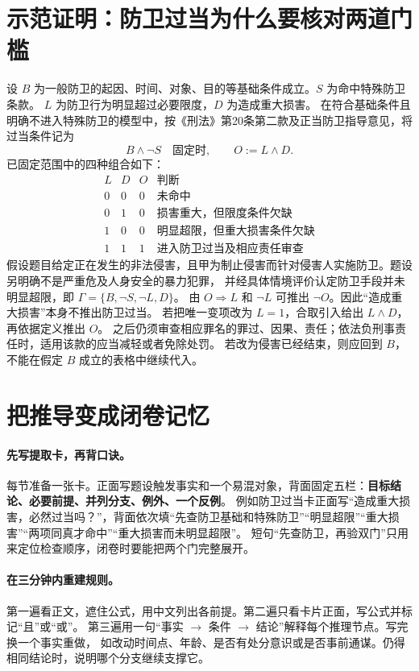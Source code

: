 \section{示范证明：防卫过当为什么要核对两道门槛}

设 $B$ 为一般防卫的起因、时间、对象、目的等基础条件成立。$S$ 为命中特殊防卫条款。
$L$ 为防卫行为明显超过必要限度，$D$ 为造成重大损害。
在符合基础条件且明确不进入特殊防卫的模型中，按《刑法》第20条第二款及正当防卫指导意见，将过当条件记为
\[
 B\land\neg S\quad\text{固定时},\qquad O:=L\land D.
\]
已固定范围中的四种组合如下：
\[
\begin{array}{cc|c|l}
 L&D&O&\text{判断}\\\hline
 0&0&0&\text{未命中}\\
 0&1&0&\text{损害重大，但限度条件欠缺}\\
 1&0&0&\text{明显超限，但重大损害条件欠缺}\\
 1&1&1&\text{进入防卫过当及相应责任审查}
\end{array}
\]
假设题目给定正在发生的非法侵害，且甲为制止侵害而针对侵害人实施防卫。题设另明确不是严重危及人身安全的暴力犯罪，
并经具体情境评价认定防卫手段并未明显超限，即 $\Gamma=\{B,\neg S,\neg L,D\}$。
由 $O\Rightarrow L$ 和 $\neg L$ 可推出 $\neg O$。因此“造成重大损害”本身不推出防卫过当。
若把唯一变项改为 $L=1$，合取引入给出 $L\land D$，再依据定义推出 $O$。
之后仍须审查相应罪名的罪过、因果、责任；依法负刑事责任时，适用该款的应当减轻或者免除处罚。
若改为侵害已经结束，则应回到 $B$，不能在假定 $B$ 成立的表格中继续代入。

\section{把推导变成闭卷记忆}

\paragraph{先写提取卡，再背口诀。}
每节准备一张卡。正面写题设触发事实和一个易混对象，背面固定五栏：\textbf{目标结论、必要前提、并列分支、例外、一个反例}。
例如防卫过当卡正面写“造成重大损害，必然过当吗？”，背面依次填“先查防卫基础和特殊防卫”“明显超限”“重大损害”“两项同真才命中”“重大损害而未明显超限”。
短句“先查防卫，再验双门”只用来定位检查顺序，闭卷时要能把两个门完整展开。

\paragraph{在三分钟内重建规则。}
第一遍看正文，遮住公式，用中文列出各前提。第二遍只看卡片正面，写公式并标记“且”或“或”。
第三遍用一句“事实 $\to$ 条件 $\to$ 结论”解释每个推理节点。写完换一个事实重做，
如改动时间点、年龄、是否有处分意识或是否事前通谋。仍得相同结论时，说明哪个分支继续支撑它。

